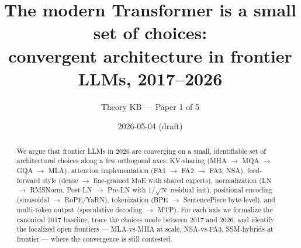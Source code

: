 








\title{
  The modern Transformer is a small set of choices: \\
  convergent architecture in frontier LLMs, 2017--2026
}
\author{Theory KB --- Paper 1 of 5}
\date{2026-05-04 (draft)}


\maketitle

\begin{abstract}
We argue that frontier LLMs in 2026 are converging on a small,
identifiable set of architectural choices along a few orthogonal axes:
KV-sharing (MHA $\to$ MQA $\to$ GQA $\to$ MLA), attention implementation
(FA1 $\to$ FA2 $\to$ FA3, NSA), feed-forward style (dense $\to$
fine-grained MoE with shared experts), normalization (LN $\to$ RMSNorm,
Post-LN $\to$ Pre-LN with $1/\sqrt{N}$ residual init), positional
encoding (sinusoidal $\to$ RoPE/YaRN), tokenization (BPE $\to$
SentencePiece byte-level), and multi-token output (speculative decoding
$\to$ MTP). For each axis we formalize the canonical 2017 baseline,
trace the choices made between 2017 and 2026, and identify the localized
open frontiers --- MLA-vs-MHA at scale, NSA-vs-FA3, SSM-hybrids at
frontier --- where the convergence is still contested.
\end{abstract}

\tableofcontents




















